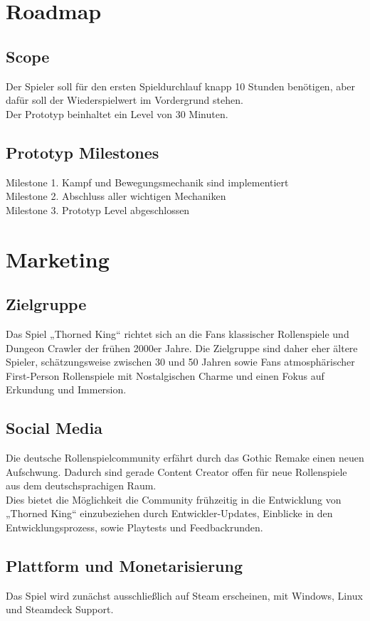 \documentclass[envcountsame,envcountchap deutsch]{i-studis}
\begin{document}
\chapter{Roadmap}
	\section{Scope}
	Der Spieler soll für den ersten Spieldurchlauf knapp 10 Stunden benötigen, aber dafür soll der
	Wiederspielwert im Vordergrund stehen. 
	\\Der Prototyp beinhaltet ein Level von 30 Minuten.
	\section{Prototyp Milestones}
	Milestone 1. Kampf und Bewegungsmechanik sind implementiert \\
	Milestone 2. Abschluss aller wichtigen Mechaniken \\
	Milestone 3. Prototyp Level abgeschlossen  \\
\chapter{Marketing}
	\section{Zielgruppe}
	Das Spiel „Thorned King“ richtet sich an die Fans klassischer Rollenspiele und Dungeon Crawler der frühen
	2000er Jahre. Die Zielgruppe sind daher eher ältere Spieler, schätzungsweise zwischen 30 und 50 Jahren
	sowie Fans atmosphärischer First-Person Rollenspiele mit Nostalgischen Charme und einen Fokus auf
	Erkundung und Immersion. 
	\section{Social Media}
	Die deutsche Rollenspielcommunity erfährt durch das Gothic Remake einen neuen Aufschwung.
	Dadurch sind gerade Content Creator offen für neue Rollenspiele aus dem deutschsprachigen Raum.
	\\
	Dies bietet die Möglichkeit die Community frühzeitig in die Entwicklung von „Thorned King“ einzubeziehen
	durch Entwickler-Updates, Einblicke in den Entwicklungsprozess, sowie Playtests und Feedbackrunden. 
	\section{Plattform und Monetarisierung}
	Das Spiel wird zunächst ausschließlich auf Steam erscheinen, mit Windows, Linux und Steamdeck Support.
\end{document}
